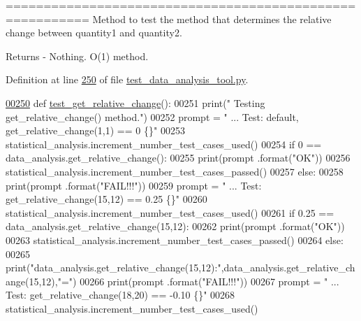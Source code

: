 ========================================================= Method to test the method that determines the relative change between quantity1 and quantity2. 

\begin{DoxyReturn}{Returns}
-\/ Nothing. O(1) method. 
\end{DoxyReturn}


Definition at line \hyperlink{test__data__analysis__tool_8py_source_l00250}{250} of file \hyperlink{test__data__analysis__tool_8py_source}{test\+\_\+data\+\_\+analysis\+\_\+tool.\+py}.


\begin{DoxyCode}
\hypertarget{classstatistics_1_1test__data__analysis__tool_1_1data__analysis__tester_l00250}{}\hyperlink{classstatistics_1_1test__data__analysis__tool_1_1data__analysis__tester_a8ca74240a173de29733a73137df4bd95}{00250}     \textcolor{keyword}{def }\hyperlink{classstatistics_1_1test__data__analysis__tool_1_1data__analysis__tester_a8ca74240a173de29733a73137df4bd95}{test\_get\_relative\_change}():
00251         print(\textcolor{stringliteral}{" Testing get\_relative\_change() method."})
00252         prompt = \textcolor{stringliteral}{"  ... Test: default, get\_relative\_change(1,1) == 0    \{\}"}
00253         statistical\_analysis.increment\_number\_test\_cases\_used()
00254         \textcolor{keywordflow}{if} 0 == data\_analysis.get\_relative\_change():
00255             print(prompt .format(\textcolor{stringliteral}{"OK"}))
00256             statistical\_analysis.increment\_number\_test\_cases\_passed()
00257         \textcolor{keywordflow}{else}:
00258             print(prompt .format(\textcolor{stringliteral}{"FAIL!!!"}))
00259         prompt = \textcolor{stringliteral}{"  ... Test: get\_relative\_change(15,12) == 0.25        \{\}"}
00260         statistical\_analysis.increment\_number\_test\_cases\_used()
00261         \textcolor{keywordflow}{if} 0.25 == data\_analysis.get\_relative\_change(15,12):
00262             print(prompt .format(\textcolor{stringliteral}{"OK"}))
00263             statistical\_analysis.increment\_number\_test\_cases\_passed()
00264         \textcolor{keywordflow}{else}:
00265             print(\textcolor{stringliteral}{"data\_analysis.get\_relative\_change(15,12):"},data\_analysis.get\_relative\_change(15,12),\textcolor{stringliteral}{"="})
00266             print(prompt .format(\textcolor{stringliteral}{"FAIL!!!"}))
00267         prompt = \textcolor{stringliteral}{"  ... Test: get\_relative\_change(18,20) == -0.10       \{\}"}
00268         statistical\_analysis.increment\_number\_test\_cases\_used()

\end{DoxyCode}
